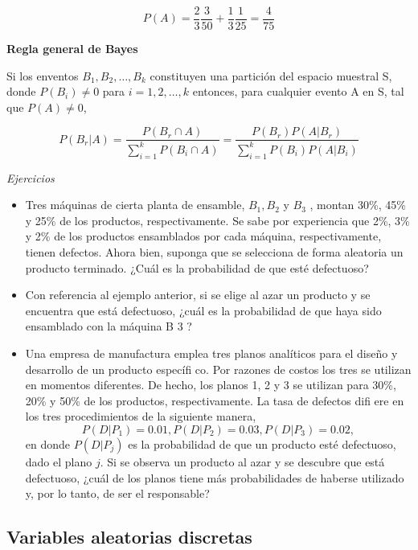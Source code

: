 \documentclass[11pt]{article}
\begin{document}
\[
P(A)= \frac{2}{3}\frac{3}{50}+ \frac{1}{3} \frac{1}{25}= \frac{4}{75}
\]

\textbf{Regla general de Bayes}

Si los enventos \(B_{1},B_{2},\ldots,B_{k}\) constituyen una partición
del espacio muestral S, donde \(P(B_{i}) \neq 0\) para
\(i=1,2,\ldots, k\) entonces, para cualquier evento A en S, tal que
\(P(A)\neq 0\),

\[
    P(B_{r}\vert A)= \frac{P(B_{r}\cap A)}{\displaystyle \sum\limits_{i=1}^{k} P(B_{i}\cap A)}= \frac{P(B_{r})P(A\vert B_{r})}{ \displaystyle \sum\limits_{i=1}^{k}P(B_{i})P(A\vert B_{i})}
\]

\emph{Ejercicios}

\begin{itemize}
\item
  Tres máquinas de cierta planta de ensamble, \(B_{1} , B_{2}\) y
  \(B_{3}\) , montan 30\%, 45\% y 25\% de los productos,
  respectivamente. Se sabe por experiencia que 2\%, 3\% y 2\% de los
  productos ensamblados por cada máquina, respectivamente, tienen
  defectos. Ahora bien, suponga que se selecciona de forma aleatoria un
  producto terminado. ¿Cuál es la probabilidad de que esté defectuoso?
\item
  Con referencia al ejemplo anterior, si se elige al azar un producto y
  se encuentra que está defectuoso, ¿cuál es la probabilidad de que haya
  sido ensamblado con la máquina B 3 ?
\item
  Una empresa de manufactura emplea tres planos analíticos para el
  diseño y desarrollo de un producto específi co. Por razones de costos
  los tres se utilizan en momentos diferentes. De hecho, los planos 1, 2
  y 3 se utilizan para 30\%, 20\% y 50\% de los productos,
  respectivamente. La tasa de defectos difi ere en los tres
  procedimientos de la siguiente manera, \[
  P(D\vert P_{1} ) = 0.01, P(D\vert P_{2} ) = 0.03, P(D \vert P_{3} ) = 0.02,
  \] en donde \(P(D\vert P_{j} )\) es la probabilidad de que un producto
  esté defectuoso, dado el plano \(j\). Si se observa un producto al
  azar y se descubre que está defectuoso, ¿cuál de los planos tiene más
  probabilidades de haberse utilizado y, por lo tanto, de ser el
  responsable?
\end{itemize}

    \hypertarget{variables-aleatorias-discretas}{%
\subsection{Variables aleatorias
discretas}\label{variables-aleatorias-discretas}}
\end{document}
